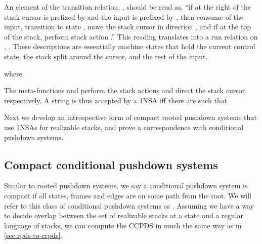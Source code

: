 An element of the transition relation, , should be read as, ``if at  the right of the stack cursor is prefixed by  and the input is prefixed by , then consume  of the input, transition to state , move the stack cursor in direction , and if at the top of the stack, perform stack action .''
This reading translates into a run relation on , .
These descriptions are essentially machine states that hold the current control state, the stack split around the cursor, and the rest of the input.

where
\begin{center}
  \begin{minipage}{0.55\linewidth}
    
  \end{minipage}
  \begin{minipage}{0.40\linewidth}
  
\end{minipage}
\end{center}

The meta-functions  and  perform the stack actions and direct the stack cursor, respectively.
A string  is thus accepted by a 1NSA  iff there are  such that


Next we develop an introspective form of compact rooted pushdown systems that use 1NSAs for realizable stacks, and prove a correspondence with conditional pushdown systems.

\subsection{Compact conditional pushdown systems}\label{sec:icrpds}

Similar to rooted pushdown systems, we say a conditional pushdown system  is compact if all states, frames and edges are on some path from the root.
We will refer to this class of conditional pushdown systems as .
Assuming we have a way to decide overlap between the set of realizable stacks at a state and a regular language of stacks, we can compute the CCPDS in much the same way as in \autoref{sec:rpds-to-crpds}.



